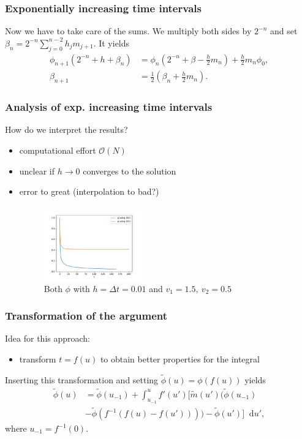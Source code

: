 \documentclass[12pt,a4paper,handout]{beamer}
\theoremstyle{definition}
\theoremstyle{plain}
\newcommand{\D}{\mathop{}\!\mathrm{d}}
\begin{document}
\begin{frame}
    \frametitle{Exponentially increasing time intervals}
    Now we have to take care of the sums. We multiply both sides by $2^{-n}$ and set $\beta_n=2^{-n}\sum_{j=0}^{n-2}h_jm_{j+1}$. It yields
    \begin{align*}
    \phi_{n+1}(2^{-n}+h+\beta_n) &= \phi_n(2^{-n}+\beta-\frac{h}{2}m_n)+\frac{h}{2}m_n\phi_0,\\
    \beta_{n+1} &= \frac{1}{2}(\beta_n+\frac{h}{2}m_n).
    \end{align*}
\end{frame}
\begin{frame}
    \frametitle{Analysis of exp. increasing time intervals}
    How do we interpret the results?
    \begin{itemize}[<+->]
        \item computational effort $\mathcal{O}(N)$
        \item unclear if $h\to 0$ converges to the solution
        \item error to great (interpolation to bad?)
        \begin{figure}
            \centering
            \includegraphics[width=0.4\textwidth]{Phidiff}
            \caption{Both $\phi$ with $h=\Delta t=0.01$ and $v_1=1.5,~v_2=0.5$}
        \end{figure}
    \end{itemize}
\end{frame}
\begin{frame}
    \frametitle{Transformation of the argument}
    Idea for this approach:
    \begin{itemize}
        \item transform $t=f(u)$ to obtain better properties for the integral
    \end{itemize}
    Inserting this transformation and setting $\tilde\phi(u)=\phi(f(u))$ yields
    \begin{align*}
        \tilde{\phi}(u)&=\tilde{\phi}(u_{-1}) +\int_{u_{-1}}^{u}f'(u')[\tilde{m}(u')(\tilde\phi(u_{-1})\\&-\tilde{\phi}(f^{-1}(f(u)-f(u'))))-\tilde{\phi}(u')]\D u',
    \end{align*}
    where $u_{-1}=f^{-1}(0)$.
\end{frame}
\end{document}
